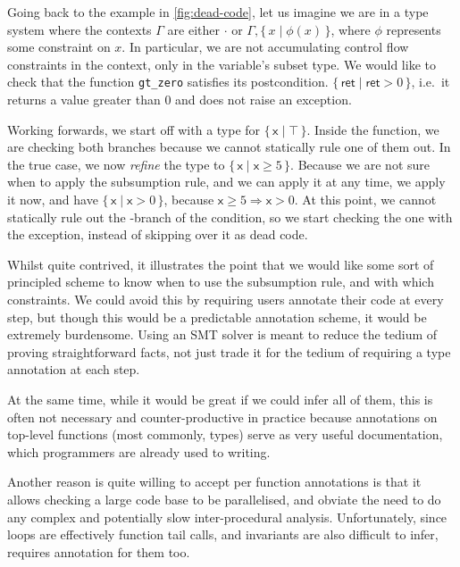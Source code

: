 Going back to the example in \cref{fig:dead-code}, let us imagine we are in a
type system where the contexts $\Gamma$ are either $\cdot$ or $\Gamma, \{\, x \mid
\phi (x) \,\}$, where $\phi$ represents some constraint on $x$. In particular, we
are not accumulating control flow constraints in the context, only
in the variable's subset type. We would like to check that the function
\texttt{gt_zero} satisfies its postcondition. $ \{\, \mathsf{ret} \mid
\mathsf{ret} > 0 \,\} $, i.e.\ it returns a value greater than 0 and does not
raise an exception.

Working forwards, we start off with a type for $\{\, \mathsf{x} \mid \top \,\}$.
Inside the function, we are checking both branches because we cannot statically
rule one of them out. In the true case, we now \emph{refine} the type to $\{\,
\mathsf{x} \mid \mathsf{x} \geq 5 \,\}$. Because we are not sure when to apply
the subsumption rule, and we can apply it at any time, we apply it now, and
have $\{\, \mathsf{x} \mid \mathsf{x} > 0 \,\}$, because $\mathsf{x} \geq 5
\Rightarrow \mathsf{x} > 0$. At this point, we cannot statically rule out the
-branch of the condition, so we start checking the one with the
exception, instead of skipping over it as dead code.

Whilst quite contrived, it illustrates the point that we would like some sort
of principled scheme to know when to use the subsumption rule, and with which
constraints. We could avoid this by requiring users annotate their code at
every step, but though this would be a predictable annotation scheme, it would
be extremely burdensome. Using an SMT solver is meant to reduce the tedium of
proving straightforward facts, not just trade it for the tedium of requiring a
type annotation at each step.

At the same time, while it would be great if we could infer all of them, this
is often not necessary and counter-productive in practice because annotations
on top-level functions (most commonly, types) serve as very useful
documentation, which programmers are already used to writing.

Another reason  is quite willing to accept per function annotations is
that it allows checking a large code base to be parallelised, and obviate the
need to do any complex and potentially slow inter-procedural analysis.
Unfortunately, since loops are effectively function tail calls, and invariants
are also difficult to infer,  requires annotation for them too.


